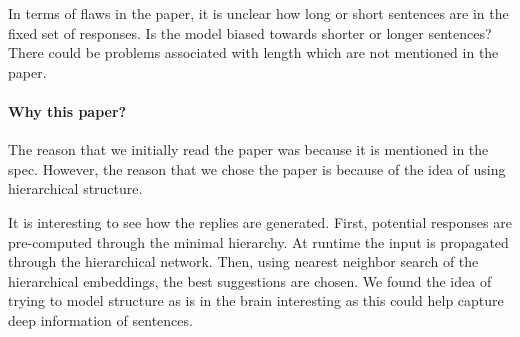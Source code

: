 \documentclass{article}
\begin{document}

In terms of flaws in the paper, it is unclear how long or short sentences are in the fixed set of responses. Is the model biased towards shorter or longer sentences? There could be problems associated with length which are not mentioned in the paper.

\paragraph{Why this paper?}

The reason that we initially read the paper was because it is mentioned in the spec. However, the reason that we chose the paper is because of the idea of using hierarchical structure.

It is interesting to see how the replies are generated. First, potential responses are pre-computed through the minimal hierarchy. At runtime the input is propagated through the hierarchical network. Then, using nearest neighbor search of the hierarchical embeddings, the best suggestions are chosen. We found the idea of trying to model structure as is in the brain interesting as this could help capture deep information of sentences.


\end{document}
